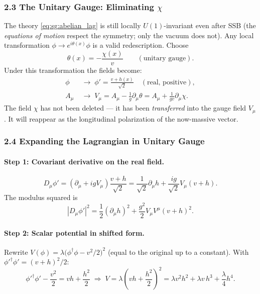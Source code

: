 \documentclass[12pt,a4paper]{article}
\begin{document}
\subsubsection*{2.3 \quad The Unitary Gauge: Eliminating $\chi$}

The theory \eqref{eq:sg:abelian_lag} is still locally $U(1)$-invariant even after SSB (the \emph{equations of motion} respect the symmetry; only the vacuum does not). Any local transformation $\phi \to e^{i\theta(x)}\phi$ is a valid redescription. Choose
\begin{equation}
  \boxed{\;\theta(x) = -\frac{\chi(x)}{v}\qquad (\text{unitary gauge}).\;}
  \label{eq:sg:unitary_gauge}
\end{equation}
Under this transformation the fields become:
\begin{align}
  \phi &\;\to\; \phi' = \frac{v + h(x)}{\sqrt{2}} \quad (\text{real, positive}) , \label{eq:sg:phi_prime}\\
  A_\mu &\;\to\; V_\mu = A_\mu - \frac{1}{g}\partial_\mu\theta
               = A_\mu + \frac{1}{gv}\partial_\mu\chi . \label{eq:sg:V_mu}
\end{align}
The field $\chi$ has not been deleted — it has been \emph{transferred} into the gauge field $V_\mu$. It will reappear as the longitudinal polarization of the now-massive vector.

\subsubsection*{2.4 \quad Expanding the Lagrangian in Unitary Gauge}

\paragraph{Step 1: Covariant derivative on the real field.}
\begin{equation}
  D_\mu\phi' = (\partial_\mu + igV_\mu)\frac{v+h}{\sqrt{2}}
             = \frac{1}{\sqrt{2}}\partial_\mu h + \frac{ig}{\sqrt{2}}V_\mu(v+h) .
\end{equation}
The modulus squared is
\begin{equation}
  |D_\mu\phi'|^2 = \frac{1}{2}(\partial_\mu h)^2
                 + \frac{g^2}{2}V_\mu V^\mu (v+h)^2 .
  \label{eq:sg:kinetic_exp}
\end{equation}

\paragraph{Step 2: Scalar potential in shifted form.}
Rewrite $V(\phi) = \lambda\bigl(\phi^\dagger\phi - v^2/2\bigr)^2$ (equal to the original up to a constant). With $\phi'^\dagger\phi' = (v+h)^2/2$:
\begin{equation}
  \phi'^\dagger\phi' - \frac{v^2}{2} = vh + \frac{h^2}{2}
  \;\Longrightarrow\;
  V = \lambda\!\left(vh + \frac{h^2}{2}\right)^{\!2}
    = \lambda v^2 h^2 + \lambda v\,h^3 + \frac{\lambda}{4}h^4 .
  \label{eq:sg:V_exp}
\end{equation}
\end{document}

